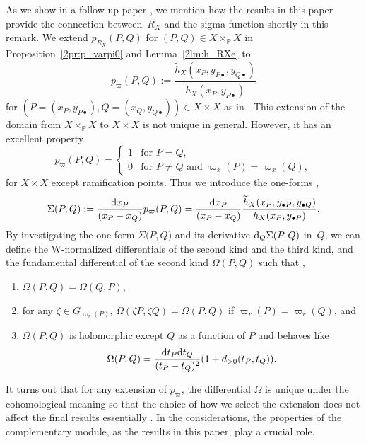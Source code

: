 \documentclass[10pt,a4paper]{amsart}
\def\PP{{\mathbb P}}
\def\th{{\widetilde h}}
\numberwithin{equation}{section}
\begin{document}
\begin{Remark}\label{rmk:Final}
As we show in a follow-up paper \cite{KMP2022b}, we mention how the results in this paper provide the connection between~$R_X$ and the sigma function shortly in this remark.
We extend $p_{R_X}(P,Q)$ for $(P,Q) \in X \times_\PP X$ in Proposition~\ref{2pr:p_varpi0} and Lemma~\ref{2lm:h_RXe} to
\[
p_{\varpi}(P,Q)
:=\frac{\th_X(x_P, y_{P\bullet}, y_{Q\bullet})}
{\th_X(x_P, y_{P\bullet})}
\]
for $(P=(x_P, y_{P\bullet}),Q=(x_Q, y_{Q\bullet})) \in X \times X$ as in \cite[Definition~12]{KMP2022b}.
This extension of the domain from $X \times_\PP X$ to $X \times X$ is not unique in general.
However, it has an excellent property
\[
p_{\varpi}(P,Q)
=
\begin{cases}
1 & \text{for } P = Q,\\
0 & \text{for } P \neq Q \text{ and }
 \varpi_x(P)=\varpi_x(Q),
\end{cases}
\]
for $X \times X$ except ramification points. Thus we introduce the one-forms \cite[Proposition~15]{KMP2022b},
\begin{equation*}
 \Sigma (P, Q )
 :=
\frac{{\rm d} x_P}{(x_P - x_Q)}p_{\varpi}(P,Q)
=
\frac{{\rm d} x_P}{(x_P - x_Q)}
\frac{\th_X(x_P, y_{\bullet P}, y_{\bullet Q})}
{h_X(x_P, y_{\bullet P})}.%
\end{equation*}
By investigating the one-form $\Sigma\big(P, Q\big)$ and its derivative ${\rm d}_Q\Sigma (P, Q )$ in~$Q$, we can define the W-normalized differentials of the second kind and the third kind, and the fundamental differential of the second kind $\Omega(P, Q)$ such that \cite[Theorem~3]{KMP2022b},
\begin{enumerate}\itemsep=0pt
\item[(1)] $\Omega(P, Q)=\Omega(Q, P)$,
\item[(2)] for any $\zeta \in G_{\varpi_r(P)}$,
$\Omega(\zeta P, \zeta Q)=\Omega(P, Q)$ if $\varpi_r(P)=\varpi_r(Q)$, and
\item[(3)]
 $\Omega(P, Q)$ is holomorphic except $Q$ as a function of $P$ and behaves like
\[
\Omega(P, Q)=\frac{{\rm d} t_P {\rm d} t_Q}{(t_P-t_Q)^2}(1 + d_{>0}(t_P, t_Q)).
\]
\end{enumerate}
It turns out that for any extension of $p_\varpi$, the differential $\Omega$ is unique under the cohomological meaning so that the choice of how we select the extension does not affect the final results essentially \cite[Proposition~16]{KMP2022b}.
In the considerations, the properties of the complementary module, as the results in this paper, play a crucial role.

\end{Remark}
\end{document}

